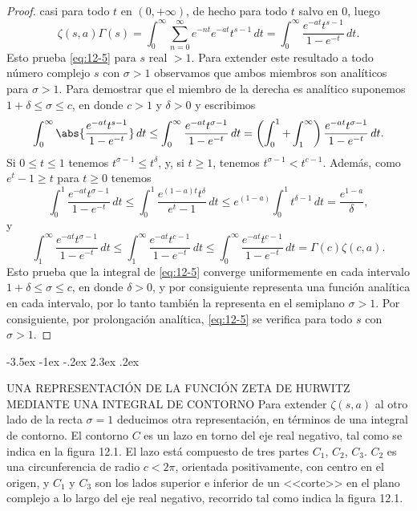 \documentclass[12pt,a4paper]{book}
\makeatletter
\renewcommand\section{\@startsection{section}{1}{\z@}%
  {-3.5ex \@plus -1ex \@minus -.2ex}%
  {2.3ex \@plus .2ex}%
  {\normalfont\Large\bfseries\raggedright}}
\makeatother
\begin{document}
\begin{proof}
        casi para todo $t$ en $(0,+\infty)$, de hecho para todo $t$ salvo en 0, luego
        \begin{equation*}
            \zeta(s,a)\Gamma(s)=\int_{0}^{\infty}\sum_{n=0}^{\infty}e^{-nt}e^{-at}t^{s-1}\,dt=\int_{0}^{\infty}\frac{e^{-at}t^{s-1}}{1-e^{-t}}\,dt.
        \end{equation*}
        Esto prueba \eqref{eq:12-5} para $s$ real $>1$. Para extender este resultado a todo
        número complejo $s$ con $\sigma>1$ observamos que ambos miembros son analíticos para
        $\sigma>1$. Para demostrar que el miembro de la derecha es analítico suponemos
        $1+\delta\leq\sigma\leq c$, en donde $c>1$ y $\delta>0$ y escribimos
        \begin{equation*}
            \int_{0}^{\infty}\abs{\frac{e^{-at}t^{s-1}}{1-e^{-t}}}\,dt\leq\int_{0}^{\infty}\frac{e^{-at}t^{\sigma-1}}{1-e^{-t}}\,dt=\left(\int_{0}^{1}+\int_{1}^{\infty}\right)\frac{e^{-at}t^{\sigma-1}}{1-e^{-t}}\,dt.
        \end{equation*}
        Si $0\leq t\leq1$ tenemos $t^{\sigma-1}\leq t^{\delta}$, y, si $t\geq1$, tenemos
        $t^{\sigma-1}<t^{c-1}$. Además, como $e^{t}-1\geq t$ para $t\geq0$ tenemos
        \begin{equation*}
            \int_{0}^{1}\frac{e^{-at}t^{\sigma-1}}{1-e^{-t}}\,dt\leq\int_{0}^{1}\frac{e^{(1-a)t}t^{\delta}}{e^{t}-1}\,dt\leq e^{(1-a)}\int_{0}^{1}t^{\delta-1}\,dt=\frac{e^{1-a}}{\delta},
        \end{equation*}
        y
        \begin{equation*}
            \int_{1}^{\infty}\frac{e^{-at}t^{\sigma-1}}{1-e^{-t}}\,dt\leq\int_{1}^{\infty}\frac{e^{-at}t^{c-1}}{1-e^{-t}}\,dt\leq\int_{0}^{\infty}\frac{e^{-at}t^{c-1}}{1-e^{-t}}\,dt=\Gamma(c)\zeta(c,a).
        \end{equation*}
        Esto prueba que la integral de \eqref{eq:12-5} converge uniformemente en cada intervalo
        $1+\delta\leq\sigma\leq c$, en donde $\delta>0$, y por consiguiente representa una
        función analítica en cada intervalo, por lo tanto también la representa en el semiplano
        $\sigma>1$. Por consiguiente, por prolongación analítica, \eqref{eq:12-5} se verifica
        para todo $s$ con $\sigma>1$.
    \end{proof}

    \section{UNA REPRESENTACIÓN DE LA FUNCIÓN ZETA DE HURWITZ MEDIANTE UNA INTEGRAL DE CONTORNO}
    Para extender $\zeta(s,a)$ al otro lado de la recta $\sigma=1$ deducimos otra
    representación, en términos de una integral de contorno. El contorno $C$ es un lazo en
    torno del eje real negativo, tal como se indica en la figura 12.1. El lazo está compuesto
    de tres partes $C_{1}$, $C_{2}$, $C_{3}$. $C_{2}$ es una circunferencia de radio $c<2\pi$,
    orientada positivamente, con centro en el origen, y $C_{1}$ y $C_{3}$ son los lados superior
    e inferior de un <<corte>> en el plano complejo a lo largo del eje real negativo, recorrido
    tal como indica la figura 12.1.
\end{document}
